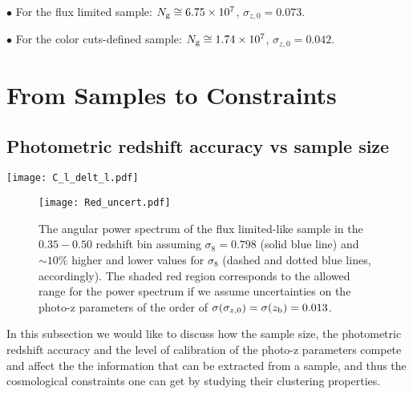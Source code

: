 \documentclass[a4paper,fleqn,usenatbib]{mnras}
\begin{document}
$\bullet$ For the flux limited sample: $N_{\mbox{\scriptsize{g}}} \cong 6.75 \times 10^7$, $\sigma_{z,0} = 0.073$.

$\bullet$ For the color cuts-defined sample: $N_{\mbox{\scriptsize{g}}} \cong 1.74 \times 10^7$, $\sigma_{z,0} = 0.042$.



\section{From Samples to Constraints}
\label{sec: Samples_Constraints}

\subsection{Photometric redshift accuracy vs sample size}
\label{subsec: Phot_red_acc}


\begin{figure*}
\centering
\texttt{[image: C\_l\_delt\_l.pdf]} 
\caption{\textit{Left panel:} The angular power spectrum, $C_\ell$, of a redMaGic-like (red)  and a flux limited-like (blue) sample, as defined in \ref{subsec: Phot_red_acc}, in a $0.35 < z <0.50$ redshift bin. \textit{Central panel:} The error on the angular power spectrum, $\delta C_\ell$ for the same samples. \textit{Right panel:} The ratio $C_\ell/\delta C_\ell$ for the two samples, presents the signal-to-noise we have in the two cases. In all three panels we also show (brown dashed vertical line) the maximum $\ell$ cutoff scale we use for our forecasts in that bin,  calculated to be $\ell = 687$ (see discussion in subsec. \ref{subsec: forecasts}).}
\label{fig: APS_and_Error}
\end{figure*}



\begin{figure}
\centering
\texttt{[image: Red\_uncert.pdf]} 
\caption{The angular power spectrum of the flux limited-like sample in the $0.35-0.50$ redshift bin assuming $\sigma_8 = 0.798$ (solid blue line) and $\sim10\%$ higher and lower values for $\sigma_8$ (dashed and dotted blue lines, accordingly). The shaded red region corresponds to the allowed range for the power spectrum if we assume uncertainties on the photo-z parameters of the order of   $\sigma(\sigma_{z,0}) = \sigma(z_{\mbox{\scriptsize{b}}}) = 0.013$.}
\label{fig: red_uncert_eff}
\end{figure}

In this subsection we would like to discuss how the sample size, the photometric redshift accuracy and the level of calibration of the photo-z parameters compete and affect the the information that can be extracted from a sample, and thus the cosmological constraints one can get by studying their clustering properties.
\end{document}
